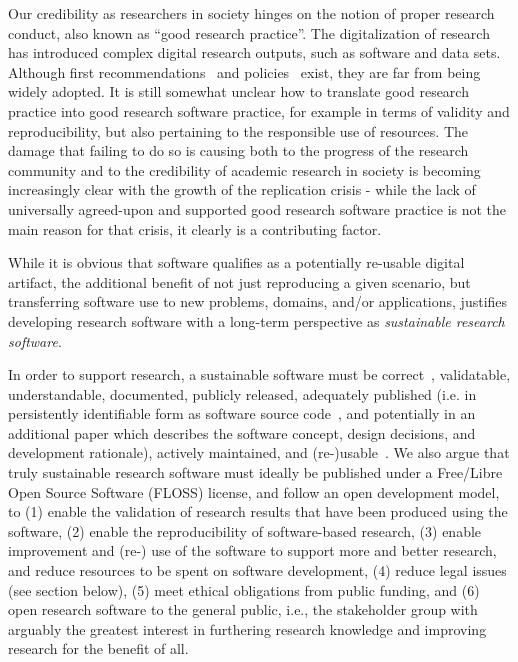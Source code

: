 \documentclass[a4paper,num-refs,numbers,sort&compress]{de-rse}
\begin{document}
Our credibility as researchers in society hinges on the notion of proper
research conduct, also known as ``good research practice''. The
digitalization of research has introduced complex digital research
outputs, such as software and data sets. Although first
recommendations~\cite{katerbow2018} 
and policies~\cite{https://doi.org/10.2312/os.helmholtz.003} exist, they are far from being widely adopted. It is still somewhat unclear how to translate good research practice into good research
software practice, for example in terms
of validity and reproducibility, but also pertaining to the responsible use of resources. The damage
that failing to do so is causing both to the progress of the research community
and to the credibility of academic research in society is becoming increasingly clear
with the growth of the replication crisis - while the lack of universally
agreed-upon and supported good research software practice is not the main
reason for that crisis, it clearly is a contributing factor.

While it is obvious that software qualifies as a potentially re-usable
digital artifact, the additional benefit of not just reproducing a given
scenario, but transferring software use to new problems, domains,
and/or applications, justifies developing research software with a long-term perspective as \emph{sustainable research software}.

In order to support research, a sustainable software must be correct~\cite{hattonChimeraSoftwareQuality2007,changRetraction2006,matthewsFiveRetractedStructure2007}, validatable, understandable, documented, publicly
released, adequately published (i.e. in persistently identifiable form
as software source code~\cite{smithSoftwareCitationPrinciples2016}, and
potentially in an additional paper which describes the software concept, design decisions, and development rationale),
actively maintained, and \mbox{(re-)usable}~\cite{meraliComputationalScienceError2010,barnesPublishYourComputer2010,tseComputerCodeMore2010}.
We also argue that truly sustainable research software must ideally be published under a Free/Libre Open Source Software (FLOSS) license, and follow an open development model, to (1) enable the validation of research results that have been produced using the software, (2) enable the reproducibility of software-based research, (3) enable improvement and (re-) use of the software to support more and better research, and reduce resources to be spent on software development, (4) reduce legal issues (see section below), (5) meet ethical obligations from public funding, and (6) open research software to the general public, i.e., the stakeholder group with arguably the greatest interest in furthering research knowledge and improving research for the benefit of all.
\end{document}
